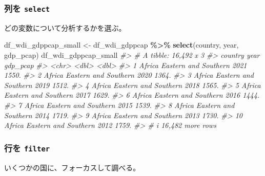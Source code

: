 \documentclass[
  xelatex, ja=standard]{bxjsbook}
\newenvironment{Shaded}{\begin{snugshade}}{\end{snugshade}}
\newcommand{\CommentTok}[1]{\textcolor[rgb]{0.56,0.35,0.01}{\textit{#1}}}
\newcommand{\FunctionTok}[1]{\textcolor[rgb]{0.13,0.29,0.53}{\textbf{#1}}}
\newcommand{\NormalTok}[1]{#1}
\newcommand{\OtherTok}[1]{\textcolor[rgb]{0.56,0.35,0.01}{#1}}
\newcommand{\SpecialCharTok}[1]{\textcolor[rgb]{0.81,0.36,0.00}{\textbf{#1}}}
\theoremstyle{definition}
\theoremstyle{definition}
\theoremstyle{definition}
\theoremstyle{definition}
\theoremstyle{remark}
\begin{document}
\hypertarget{ux5217ux3092-select}{%
\subsubsection{\texorpdfstring{列を \texttt{select}}{列を select}}\label{ux5217ux3092-select}}

どの変数について分析するかを選ぶ。

\begin{Shaded}
\begin{Highlighting}[]
\NormalTok{df\_wdi\_gdppcap\_small }\OtherTok{\textless{}{-}}\NormalTok{ df\_wdi\_gdppcap }\SpecialCharTok{\%\textgreater{}\%} 
  \FunctionTok{select}\NormalTok{(country, year, gdp\_pcap)}
\NormalTok{df\_wdi\_gdppcap\_small}
\CommentTok{\#\textgreater{} \# A tibble: 16,492 x 3}
\CommentTok{\#\textgreater{}    country                      year gdp\_pcap}
\CommentTok{\#\textgreater{}    \textless{}chr\textgreater{}                       \textless{}dbl\textgreater{}    \textless{}dbl\textgreater{}}
\CommentTok{\#\textgreater{}  1 Africa Eastern and Southern  2021    1550.}
\CommentTok{\#\textgreater{}  2 Africa Eastern and Southern  2020    1364.}
\CommentTok{\#\textgreater{}  3 Africa Eastern and Southern  2019    1512.}
\CommentTok{\#\textgreater{}  4 Africa Eastern and Southern  2018    1565.}
\CommentTok{\#\textgreater{}  5 Africa Eastern and Southern  2017    1629.}
\CommentTok{\#\textgreater{}  6 Africa Eastern and Southern  2016    1444.}
\CommentTok{\#\textgreater{}  7 Africa Eastern and Southern  2015    1539.}
\CommentTok{\#\textgreater{}  8 Africa Eastern and Southern  2014    1719.}
\CommentTok{\#\textgreater{}  9 Africa Eastern and Southern  2013    1730.}
\CommentTok{\#\textgreater{} 10 Africa Eastern and Southern  2012    1759.}
\CommentTok{\#\textgreater{} \# i 16,482 more rows}
\end{Highlighting}
\end{Shaded}

\hypertarget{ux884cux3092-filter}{%
\subsubsection{\texorpdfstring{行を \texttt{filter}}{行を filter}}\label{ux884cux3092-filter}}

いくつかの国に、フォーカスして調べる。
\end{document}
